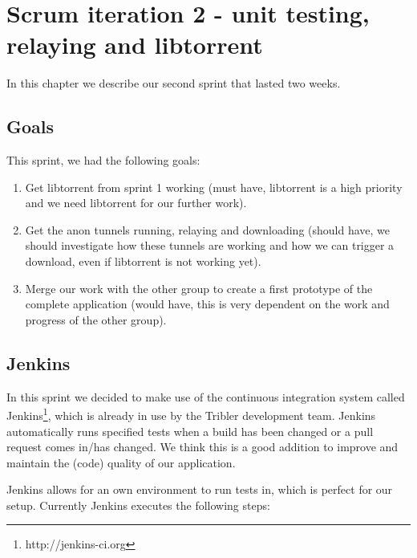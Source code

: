 \chapter{Scrum iteration 2 - unit testing, relaying and libtorrent}
\label{cpt:iteration2}
	In this chapter we describe our second sprint that lasted two weeks.

	\section{Goals}
		This sprint, we had the following goals:
	
		\begin{enumerate}
			\item Get libtorrent from sprint 1 working (must have, libtorrent is a high priority and we need libtorrent for our further work).
			\item Get the anon tunnels running, relaying and downloading (should have, we should investigate how these tunnels are working and how we can trigger a download, even if libtorrent is not working yet).
			\item Merge our work with the other group to create a first prototype of the complete application (would have, this is very dependent on the work and progress of the other group).
		\end{enumerate}
	
	\section{Jenkins}
		\label{sec:jenkins}
		In this sprint we decided to make use of the continuous integration system called Jenkins\footnote{http://jenkins-ci.org}, which is already in use by the Tribler development team. Jenkins automatically runs specified tests when a build has been changed or a pull request comes in/has changed. We think this is a good addition to improve and maintain the (code) quality of our application.
		
		Jenkins allows for an own environment to run tests in, which is perfect for our setup. Currently Jenkins executes the following steps:
		
